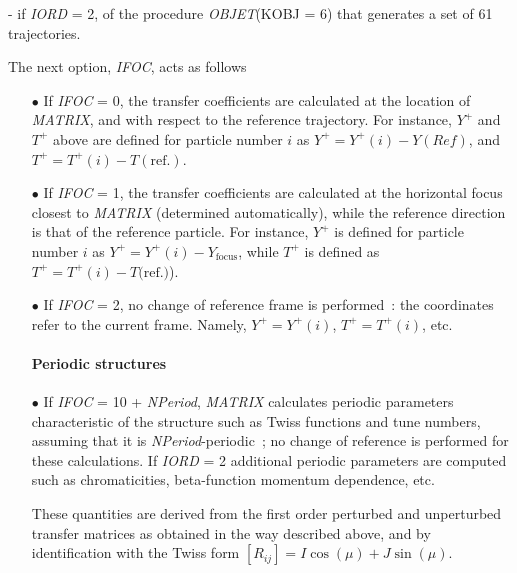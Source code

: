 \noindent - if  \textsl{IORD} = 2, of the procedure \textsl{OBJET}(KOBJ = 6)  that generates 
 a set of 61 trajectories. 


\bigskip

\noindent The next option, \textsl{IFOC}, acts as follows \par

\begin{itemize}
\item[$\bullet$] If \textsl{IFOC} = 0,  the transfer coefficients are calculated
at the location of \textsl{MATRIX}, and with respect to the reference trajectory. 
For instance, $ Y^+ $ and $ T^+ $ above are defined for particle number $ i $ as 
$Y^+=Y^+(i)-Y(Ref)$,  and $ T^+=T^+(i)-T(\textrm{ref.})$.  

\item[$\bullet$] If \textsl{IFOC} = 1, the transfer coefficients are calculated at the 
horizontal focus  closest to \textsl{MATRIX} (determined 
automatically), while the reference direction is that of the reference  particle. For 
instance, $ Y^+ $ is defined for particle number $ i $ as $ Y^+=Y^+(i) -Y_{\text{focus}} $, 
while  $ T^+ $ is defined as $ T^+=T^+(i)-T(\textrm{ref.)}$).  

\item[$\bullet$] If \textsl{IFOC} = 2, no change of reference frame is 
performed~: the coordinates refer to the current frame. Namely, $ Y^+=Y^+(i)$, 
$ T^+=T^+(i)$,  etc. \

\paragraph{Periodic structures} 

\item[$\bullet$] If \textsl{IFOC} = 10  +  \textsl{NPeriod}, \textsl{MATRIX} calculates
 periodic parameters characteristic  of the structure 
such as Twiss functions and tune numbers, assuming that it is \textsl{NPeriod}-periodic~; 
 no change of reference is performed for these calculations. 
If  \textsl{IORD} = 2 additional 
periodic parameters are computed such as chromaticities, beta-function momentum dependence, 
 etc. 

These quantities are derived from the first order perturbed and unperturbed transfer 
matrices as obtained in the way described above, and by identification with the Twiss form $ [R_{ij}] 
= I \cos(\mu) + J \sin(\mu)$. 
\end{itemize}

